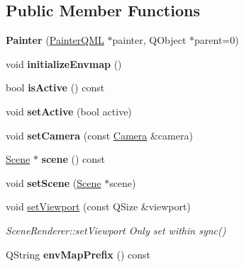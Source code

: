 \subsection*{Public Member Functions}
\begin{DoxyCompactItemize}
\item 
\hypertarget{class_painter_ae9520672fc113fc60cf942ba3d13a46e}{}{\bfseries Painter} (\hyperlink{class_painter_q_m_l}{Painter\+Q\+M\+L} $\ast$painter, Q\+Object $\ast$parent=0)\label{class_painter_ae9520672fc113fc60cf942ba3d13a46e}

\item 
\hypertarget{class_painter_ae2a4d4b93b38b14ca5510b3d66f9752f}{}void {\bfseries initialize\+Envmap} ()\label{class_painter_ae2a4d4b93b38b14ca5510b3d66f9752f}

\item 
\hypertarget{class_painter_addfa0fd4dd943d27c67b62dfc9ab3a0b}{}bool {\bfseries is\+Active} () const \label{class_painter_addfa0fd4dd943d27c67b62dfc9ab3a0b}

\item 
\hypertarget{class_painter_a7dd43be8d3e1eab98035fcc23316bd1a}{}void {\bfseries set\+Active} (bool active)\label{class_painter_a7dd43be8d3e1eab98035fcc23316bd1a}

\item 
\hypertarget{class_painter_ae666ca89f52438dd898054a38cb7678c}{}void {\bfseries set\+Camera} (const \hyperlink{class_camera}{Camera} \&camera)\label{class_painter_ae666ca89f52438dd898054a38cb7678c}

\item 
\hypertarget{class_painter_a9a306e3a17dcd709a1e23faf8b28cab3}{}\hyperlink{class_scene}{Scene} $\ast$ {\bfseries scene} () const \label{class_painter_a9a306e3a17dcd709a1e23faf8b28cab3}

\item 
\hypertarget{class_painter_ad0c60a921518aac36ecbbf9c050bb779}{}void {\bfseries set\+Scene} (\hyperlink{class_scene}{Scene} $\ast$scene)\label{class_painter_ad0c60a921518aac36ecbbf9c050bb779}

\item 
void \hyperlink{class_painter_a6cbe31709ecd794c00d4c524c8468b14}{set\+Viewport} (const Q\+Size \&viewport)
\begin{DoxyCompactList}\small\item\em Scene\+Renderer\+::set\+Viewport Only set within sync() \end{DoxyCompactList}\item 
\hypertarget{class_painter_a3a8ffdc1e2408e267717ed3816e93e19}{}Q\+String {\bfseries env\+Map\+Prefix} () const \label{class_painter_a3a8ffdc1e2408e267717ed3816e93e19}


\end{DoxyCompactItemize}
